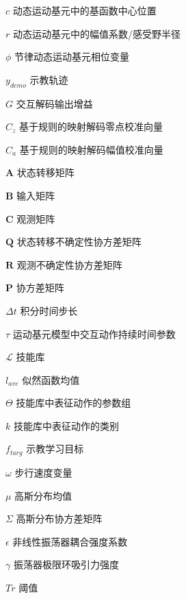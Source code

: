 \begin{notation}
\begin{notationlist}{2em}
    \item[$\displaystyle c$] 动态运动基元中的基函数中心位置
    \item[$\displaystyle r$] 动态运动基元中的幅值系数/感受野半径
    \item[$\displaystyle \phi$] 节律动态运动基元相位变量
    \item[$\displaystyle y_{demo}$] 示教轨迹
    \item[$\displaystyle G$] 交互解码输出增益
    \item[$\displaystyle C_z$] 基于规则的映射解码零点校准向量
    \item[$\displaystyle C_a$] 基于规则的映射解码幅值校准向量
    \item[$\displaystyle \mathbf{A}$] 状态转移矩阵
    \item[$\displaystyle \mathbf{B}$] 输入矩阵
    \item[$\displaystyle \mathbf{C}$] 观测矩阵
    \item[$\displaystyle \mathbf{Q}$] 状态转移不确定性协方差矩阵
    \item[$\displaystyle \mathbf{R}$] 观测不确定性协方差矩阵
    \item[$\displaystyle \mathbf{P}$] 协方差矩阵
    \item[$\displaystyle \Delta t$] 积分时间步长
    \item[$\displaystyle \tau$] 运动基元模型中交互动作持续时间参数
    \item[$\displaystyle \mathscr{L}$] 技能库
    \item[$\displaystyle l_{ave}$] 似然函数均值
    \item[$\displaystyle \Theta$] 技能库中表征动作的参数组
    \item[$\displaystyle k$] 技能库中表征动作的类别
    \item[$\displaystyle f_{targ}$] 示教学习目标
    \item[$\displaystyle \omega$] 步行速度变量
    \item[$\displaystyle \mu$] 高斯分布均值
    \item[$\displaystyle \Sigma$] 高斯分布协方差矩阵
    \item[$\displaystyle \epsilon$] 非线性振荡器耦合强度系数
    \item[$\displaystyle \gamma$] 振荡器极限环吸引力强度
    \item[$\displaystyle Tr$] 阈值
    
  \end{notationlist}

\end{notation}





